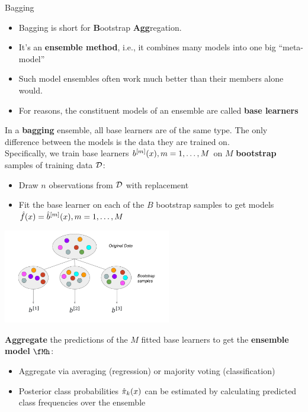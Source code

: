 \documentclass[11pt,compress,t,notes=noshow, xcolor=table]{beamer}
\begin{document}
\begin{vbframe}{Bagging}

\begin{itemize}
  \item Bagging is short for \textbf{B}ootstrap \textbf{Agg}regation.
  \item It's an \textbf{ensemble method}, i.e., it combines many models into one 
        big \enquote{meta-model}
  \item Such model ensembles often work much better than their members alone would.
  \item For reasons, the constituent models of an ensemble are called \textbf{base learners} 
\end{itemize}

\framebreak 
In a \textbf{bagging} ensemble, all base learners are of the same type. The only difference between the models is the data they are trained on.\\
Specifically, we train base learners $b^{[m]}(x), m = 1, \dots, M$ on $M$ \textbf{bootstrap} samples of training data $\mathcal{D}$:
\begin{itemize}
  \item Draw $n$ observations from $\mathcal{D}$ with replacement
  \item Fit the base learner on each of the $B$ bootstrap samples to get models $\hat{f}(x) = \hat{b}^{[m]}(x), m = 1, \dots, M$
\end{itemize}

\begin{center}
\includegraphics[width=0.55\textwidth]{figure_man/bagging.pdf}
\end{center}

\framebreak

\textbf{Aggregate} the predictions of the $M$ fitted base learners to get the
\textbf{ensemble model} $\fMh$:
  \begin{itemize}
    \item Aggregate via averaging (regression) or majority voting (classification)
    \item Posterior class probabilities $\hat \pi_k(x)$ can be estimated by calculating predicted class frequencies over the ensemble
  \end{itemize}


\end{vbframe}
\end{document}
